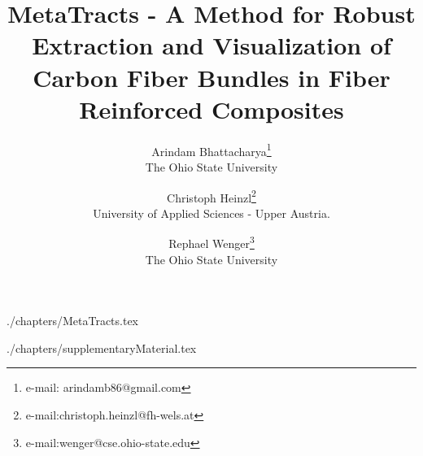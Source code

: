 \documentclass{vgtc}                          %
\title{MetaTracts - A Method for Robust Extraction and Visualization of Carbon Fiber Bundles in Fiber Reinforced Composites}
\author{Arindam Bhattacharya\thanks{e-mail: arindamb86@gmail.com}\\ %
        \scriptsize The Ohio State University %
\and Christoph Heinzl\thanks{e-mail:christoph.heinzl@fh-wels.at}\\ %
     \scriptsize University of Applied Sciences - Upper Austria. %
\and Rephael Wenger\thanks{e-mail:wenger@cse.ohio-state.edu}\\ %
    \scriptsize The Ohio State University}
\begin{document}


\maketitle

 {./chapters/MetaTracts.tex}





 {./chapters/supplementaryMaterial.tex}
\end{document}
